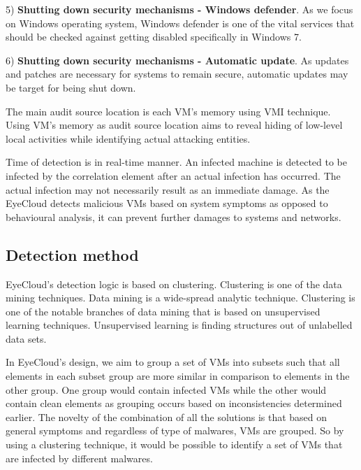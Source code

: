 \documentclass[conference]{IEEEtran}
\begin{document}
5) \textbf{Shutting down security mechanisms - Windows defender}. As we focus on Windows operating system, Windows defender is one of the vital services that should be checked against getting disabled specifically in Windows 7.

6) \textbf{Shutting down security mechanisms - Automatic update}. As updates and patches are necessary for systems to remain secure, automatic updates may be target for being shut down. 

The main audit source location is each VM's memory using VMI technique. Using VM's memory as audit source location aims to reveal hiding of low-level local activities while identifying actual attacking entities. 

Time of detection is in real-time manner. An infected machine is detected to be infected by the correlation element after an actual infection has occurred. The actual infection may not necessarily result as an immediate damage. As the EyeCloud detects malicious VMs based on system symptoms as opposed to behavioural analysis, it can prevent further damages to systems and networks.  
\subsection{Detection method}
EyeCloud's detection logic is based on clustering. Clustering is one of the data mining techniques. Data mining is a wide-spread analytic technique. Clustering is one of the notable branches of data mining that is based on unsupervised learning techniques. Unsupervised learning is finding structures out of unlabelled data sets. 

In EyeCloud's design, we aim to group a set of VMs into subsets such that all elements in each subset group are more similar in comparison to elements in the other group. One group would contain infected VMs while the other would contain clean elements as grouping occurs based on inconsistencies determined earlier. The novelty of the combination of all the solutions is that based on general symptoms and regardless of type of malwares, VMs are grouped. So by using a clustering technique, it would be possible to identify a set of VMs that are infected by different malwares. 
\end{document}
